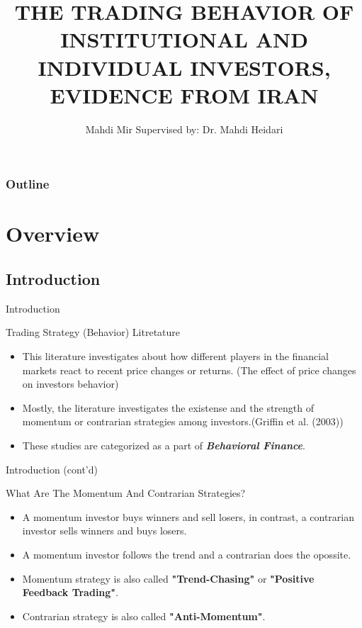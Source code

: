 \documentclass{beamer}
\title[]{\MakeUppercase{The Trading Behavior of Institutional and Individual Investors, Evidence from Iran}}
\subtitle{}
\author[]{Mahdi Mir \newline Supervised by: Dr. Mahdi Heidari}
\institute[]{TeIAS}
\date[]{}
\begin{document}
\begin{frame}
    \titlepage{}
\end{frame}

\begin{frame}[label=toc]
    \frametitle{Outline}
    \tableofcontents{}
\end{frame}


\section{Overview}
\subsection{Introduction}


\begin{frame}{Introduction}
    \begin{block}{Trading Strategy (Behavior) Litretature}
        \begin{itemize}
            \item This literature investigates about how different players in the financial markets react to recent price changes or returns. (The effect of price changes on investors behavior)
            \item Mostly, the literature investigates the existense and the strength of momentum or contrarian strategies among investors.(Griffin et al. (2003))
            \item These studies are categorized as a part of \textit{\textbf{Behavioral Finance}}.
        \end{itemize}
    \end{block}
\end{frame}

\begin{frame}{Introduction (cont'd)}
    \begin{block}{What Are The Momentum And Contrarian Strategies?}
        \begin{itemize}
            \item A momentum investor buys winners and sell losers, in contrast, a contrarian investor sells winners and buys losers.
            \item A momentum investor follows the trend and a contrarian does the opossite.
            \item Momentum strategy is also called \textbf{"Trend-Chasing"} or \textbf{"Positive Feedback Trading"}.
            \item Contrarian strategy is also called \textbf{"Anti-Momentum"}.
        \end{itemize}
    \end{block}
\end{frame}
\end{document}

